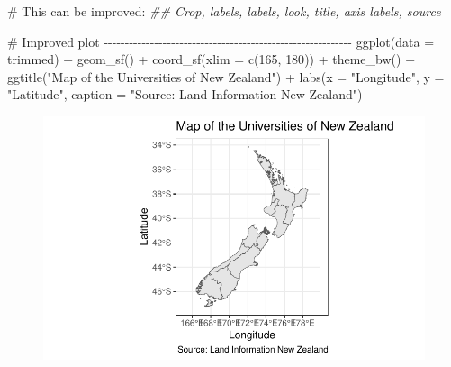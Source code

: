 \documentclass[
  letterpaper,
  DIV=11,
  numbers=noendperiod]{scrartcl}
\newenvironment{Shaded}{\begin{snugshade}}{\end{snugshade}}
\newcommand{\AttributeTok}[1]{\textcolor[rgb]{0.40,0.45,0.13}{#1}}
\newcommand{\CommentTok}[1]{\textcolor[rgb]{0.37,0.37,0.37}{#1}}
\newcommand{\DecValTok}[1]{\textcolor[rgb]{0.68,0.00,0.00}{#1}}
\newcommand{\DocumentationTok}[1]{\textcolor[rgb]{0.37,0.37,0.37}{\textit{#1}}}
\newcommand{\FunctionTok}[1]{\textcolor[rgb]{0.28,0.35,0.67}{#1}}
\newcommand{\NormalTok}[1]{\textcolor[rgb]{0.00,0.23,0.31}{#1}}
\newcommand{\SpecialCharTok}[1]{\textcolor[rgb]{0.37,0.37,0.37}{#1}}
\newcommand{\StringTok}[1]{\textcolor[rgb]{0.13,0.47,0.30}{#1}}
\begin{document}
\begin{Shaded}
\begin{Highlighting}[]
\CommentTok{\# This can be improved:}
\DocumentationTok{\#\#  Crop, labels, labels, look, title, axis labels, source}


\CommentTok{\# Improved plot {-}{-}{-}{-}{-}{-}{-}{-}{-}{-}{-}{-}{-}{-}{-}{-}{-}{-}{-}{-}{-}{-}{-}{-}{-}{-}{-}{-}{-}{-}{-}{-}{-}{-}{-}{-}{-}{-}{-}{-}{-}{-}{-}{-}{-}{-}{-}{-}{-}{-}{-}{-}{-}{-}{-}{-}{-}{-}{-}}
\FunctionTok{ggplot}\NormalTok{(}\AttributeTok{data =}\NormalTok{ trimmed) }\SpecialCharTok{+}
  \FunctionTok{geom\_sf}\NormalTok{() }\SpecialCharTok{+}
  \FunctionTok{coord\_sf}\NormalTok{(}\AttributeTok{xlim =} \FunctionTok{c}\NormalTok{(}\DecValTok{165}\NormalTok{, }\DecValTok{180}\NormalTok{)) }\SpecialCharTok{+}
  \FunctionTok{theme\_bw}\NormalTok{() }\SpecialCharTok{+}
  \FunctionTok{ggtitle}\NormalTok{(}\StringTok{"Map of the Universities of New Zealand"}\NormalTok{) }\SpecialCharTok{+}
  \FunctionTok{labs}\NormalTok{(}\AttributeTok{x =} \StringTok{"Longitude"}\NormalTok{, }
       \AttributeTok{y =} \StringTok{"Latitude"}\NormalTok{, }
       \AttributeTok{caption =} \StringTok{"Source: Land Information New Zealand"}\NormalTok{)}
\end{Highlighting}
\end{Shaded}

\begin{figure}[H]

{\centering \includegraphics{Introduction-to-mapping_files/figure-pdf/making tighter map-2.pdf}

}

\end{figure}
\end{document}

